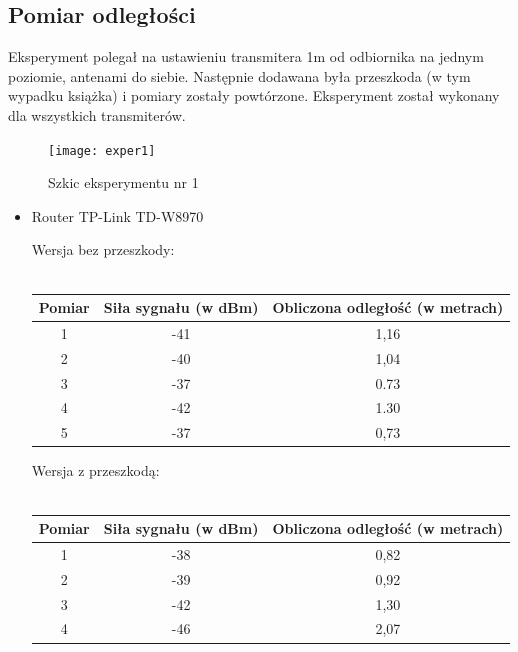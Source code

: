 \documentclass{article}
\begin{document}
		\subsection{Pomiar odległości}
			Eksperyment polegał na ustawieniu transmitera 1m od odbiornika na jednym poziomie, antenami do siebie. Następnie dodawana była przeszkoda (w tym wypadku książka) i pomiary zostały powtórzone. Eksperyment został wykonany dla wszystkich transmiterów.\\			
			\begin{figure}	
				\centering			
				\caption{Szkic eksperymentu nr 1}
				\texttt{[image: exper1]}
			\end{figure}
			\begin{itemize}
				\item Router TP-Link TD-W8970
				\begin{center}
					\begin{minipage}{\linewidth}
					Wersja bez przeszkody:\\\\
					\begin{tabular}{|c|c|c|}
						\hline 
						Pomiar & Siła sygnału (w dBm) & Obliczona odległość (w metrach) \\ 
						\hline 
						1 & -41 & 1,16 \\ 
						\hline 
						2 & -40 & 1,04 \\ 
						\hline 
						3 & -37 & 0.73 \\ 
						\hline 
						4 & -42 & 1.30 \\ 
						\hline 
						5 & -37 & 0,73 \\ 
						\hline 
					\end{tabular} 
				\end{minipage} 
				\end{center}
				\begin{center}
					\begin{minipage}{\linewidth}
						Wersja z przeszkodą:\\\\
					\begin{tabular}{|c|c|c|}
						\hline 
						Pomiar & Siła sygnału (w dBm) & Obliczona odległość (w metrach) \\ 
						\hline 
						1 & -38 & 0,82 \\ 
						\hline 
						2 & -39 & 0,92 \\ 
						\hline 
						3 & -42 & 1,30 \\ 
						\hline 
						4 & -46 & 2,07 \\ 

\end{tabular}
\end{minipage}
\end{center}
\end{itemize}
\end{document}
